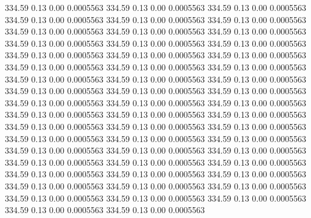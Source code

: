  334.59    0.13    0.00   0.0005563
 334.59    0.13    0.00   0.0005563
 334.59    0.13    0.00   0.0005563
 334.59    0.13    0.00   0.0005563
 334.59    0.13    0.00   0.0005563
 334.59    0.13    0.00   0.0005563
 334.59    0.13    0.00   0.0005563
 334.59    0.13    0.00   0.0005563
 334.59    0.13    0.00   0.0005563
 334.59    0.13    0.00   0.0005563
 334.59    0.13    0.00   0.0005563
 334.59    0.13    0.00   0.0005563
 334.59    0.13    0.00   0.0005563
 334.59    0.13    0.00   0.0005563
 334.59    0.13    0.00   0.0005563
 334.59    0.13    0.00   0.0005563
 334.59    0.13    0.00   0.0005563
 334.59    0.13    0.00   0.0005563
 334.59    0.13    0.00   0.0005563
 334.59    0.13    0.00   0.0005563
 334.59    0.13    0.00   0.0005563
 334.59    0.13    0.00   0.0005563
 334.59    0.13    0.00   0.0005563
 334.59    0.13    0.00   0.0005563
 334.59    0.13    0.00   0.0005563
 334.59    0.13    0.00   0.0005563
 334.59    0.13    0.00   0.0005563
 334.59    0.13    0.00   0.0005563
 334.59    0.13    0.00   0.0005563
 334.59    0.13    0.00   0.0005563
 334.59    0.13    0.00   0.0005563
 334.59    0.13    0.00   0.0005563
 334.59    0.13    0.00   0.0005563
 334.59    0.13    0.00   0.0005563
 334.59    0.13    0.00   0.0005563
 334.59    0.13    0.00   0.0005563
 334.59    0.13    0.00   0.0005563
 334.59    0.13    0.00   0.0005563
 334.59    0.13    0.00   0.0005563
 334.59    0.13    0.00   0.0005563
 334.59    0.13    0.00   0.0005563
 334.59    0.13    0.00   0.0005563
 334.59    0.13    0.00   0.0005563
 334.59    0.13    0.00   0.0005563
 334.59    0.13    0.00   0.0005563
 334.59    0.13    0.00   0.0005563
 334.59    0.13    0.00   0.0005563
 334.59    0.13    0.00   0.0005563
 334.59    0.13    0.00   0.0005563
 334.59    0.13    0.00   0.0005563
 334.59    0.13    0.00   0.0005563
 334.59    0.13    0.00   0.0005563
 334.59    0.13    0.00   0.0005563
